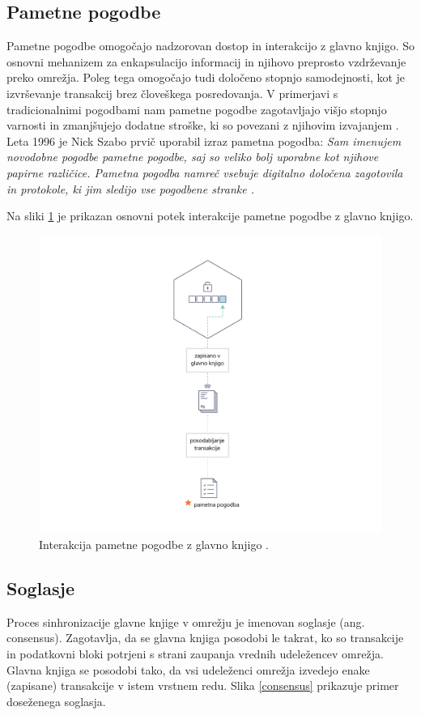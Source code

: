 \documentclass[a4paper, 12pt]{book}
\begin{document}
\subsection{Pametne pogodbe}
Pametne pogodbe omogočajo nadzorovan dostop in interakcijo z glavno knjigo.
So osnovni mehanizem za enkapsulacijo informacij in njihovo preprosto vzdrže\-vanje preko omrežja.
Poleg tega omogočajo tudi določeno stopnjo samodejnosti, kot je izvrševanje transakcij brez človeškega posredovanja.
V primerjavi s tradicionalnimi pogodbami nam pametne pogodbe zagotavljajo višjo stopnjo varnosti in zmanjšujejo dodatne stroške, ki so povezani z njihovim izvajanjem \cite{atzei2017survey}.
Leta 1996 je Nick Szabo prvič uporabil izraz pametna pogodba:
\textit{Sam imenujem novodobne pogodbe pametne pogodbe,  saj so
veliko bolj uporabne kot njihove papirne različice.  Pametna pogodba namreč vsebuje digitalno določena zagotovila in protokole,
ki jim sledijo vse pogodbene stranke \cite{szabo1996smart, balanticd}.}

Na sliki \ref{smart_contract} je prikazan osnovni potek interakcije pametne pogodbe z glavno knjigo.

\begin{figure}[h]
	\includegraphics[width=1.0\textwidth]{slike/Smart_Contract_sl.png}
	\caption{Interakcija pametne pogodbe z glavno knjigo \cite{hyperledgerDocs}.}
	\label{smart_contract}
\end{figure}


\subsection{Soglasje}
Proces sinhronizacije glavne knjige v omrežju je imenovan soglasje (ang. consensus).
Zagotavlja, da se glavna knjiga posodobi le takrat, ko so transakcije in podatkovni bloki potrjeni s strani zaupanja vrednih udeležencev omrežja.
Glavna knjiga se posodobi tako, da vsi udeleženci omrežja izvedejo enake (zapisane) transakcije v istem vrstnem redu.
Slika \ref{consensus} prikazuje primer doseženega soglasja.
\end{document}

